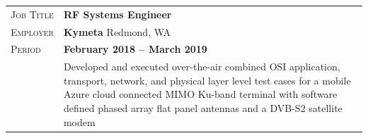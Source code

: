 \documentclass[a4paper, oneside, final]{scrartcl}
\newcommand{\gray}{\rowcolor[gray]{.90}} %
\begin{document}
\begin{center}
\begin{tabularx}{0.97\linewidth}{>{\raggedleft\scshape}p{2cm}X}
\gray Job Title & \textbf{RF Systems Engineer}\\
\gray Employer & \textbf{Kymeta} \hfill Redmond, WA\\
\gray Period & \textbf{February 2018 -- March 2019}\\
&
\vspace{-0.15 cm}
Developed and executed over-the-air combined OSI application, transport, network, and physical layer level test cases for a mobile Azure cloud connected MIMO Ku-band terminal with software defined phased array flat panel antennas and a DVB-S2 satellite modem
\newline
\end{tabularx}



\end{center}
\end{document}

